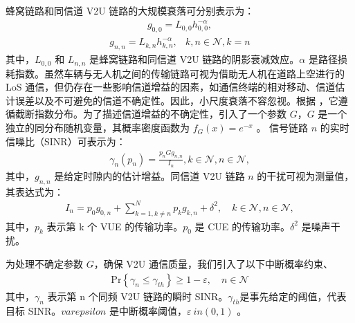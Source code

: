 蜂窝链路和同信道 V2U 链路的大规模衰落可分别表示为：
\begin{eqnarray}\label{3}
g_{0,0}=L_{0,0}h_{0,0}^{-\alpha},
\end{eqnarray}
\begin{eqnarray}\label{4}
g_{n,n}=L_{k,n}h_{k,n}^{-\alpha},          &k, n\in \mathcal{N}, k=n
\end{eqnarray}
其中，$L_{0,0}$ 和 $L_{n,n}$ 是蜂窝链路和同信道 V2U 链路的阴影衰减效应。$\alpha$ 是路径损耗指数。虽然车辆与无人机之间的传输链路可视为借助无人机在道路上空进行的 LoS 通信，但仍存在一些影响信道增益的因素，如通信终端的相对移动、信道估计误差以及不可避免的信道不确定性。因此，小尺度衰落不容忽视。根据 \cite{CCO}，它遵循截断指数分布。为了描述信道增益的不确定性，引入了一个参数 $G$，$G$ 是一个独立的同分布随机变量，其概率密度函数为 $f_G (x)=e^{-x}$ 。
信号链路 $n$ 的实时信噪比（SINR）可表示为：
\begin{eqnarray}\label{5}
\gamma_{n}(p_n)=\frac{p_{n}G g_{n,n}}{I_n}, k\in\mathcal{N},n\in\mathcal{N},
\end{eqnarray}
其中，$g_{n,n}$ 是给定时隙内的估计增益。同信道 V2U 链路 $n$ 的干扰可视为测量值，其表达式为：
\begin{eqnarray}\label{6}
I_n=p_0 g_{0,n}+\!\!\!\sum\limits_{k=1,k\neq n}^N\!\!\!\! p_k g_{k,n}+\delta^2, \quad k\in\mathcal{N},n\in\mathcal{N},
\end{eqnarray}
其中，$p_k$ 表示第 k 个 VUE 的传输功率。$p_0$ 是 CUE 的传输功率。$\delta^2$ 是噪声干扰。

为处理不确定参数 $G$，确保 V2U 通信质量，我们引入了以下中断概率约束、
\begin{eqnarray}\label{7}
\textrm{Pr}\left\{\gamma_{n} \leq \gamma_{th}\right\}\geq1-\varepsilon,\quad  n\in\mathcal{N}
\end{eqnarray}
其中，$\gamma_{n}$ 表示第 n 个同频 V2U 链路的瞬时 SINR。$\gamma_{th}$是事先给定的阈值，代表目标 SINR。$varepsilon$ 是中断概率阈值，$\varepsilon \ in (0,1)$ 。

